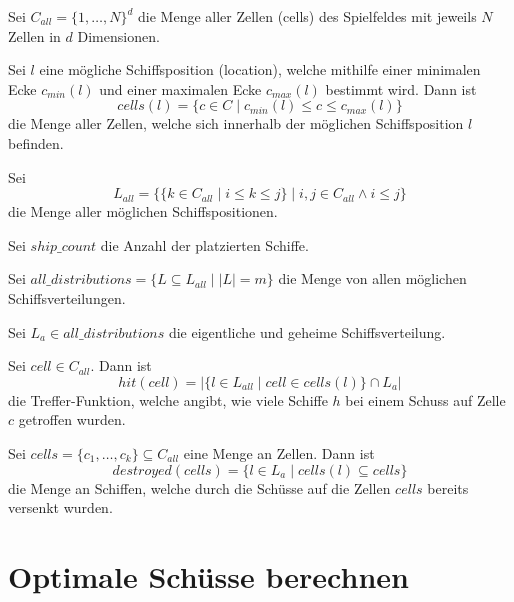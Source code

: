 \documentclass[a4paper,12pt]{llncs}
\numberwithin{equation}{section}
\begin{document}
\begin{definition}
Sei $C_{all}=\{1, \dots, N\}^d$ die Menge aller Zellen (cells) des Spielfeldes mit jeweils $N$ Zellen in $d$ Dimensionen.
\end{definition}

\begin{definition}
Sei $l$ eine mögliche Schiffsposition (location), welche mithilfe einer minimalen Ecke $c_{min}(l)$ und einer maximalen Ecke $c_{max}(l)$ bestimmt wird. Dann ist
\[
cells(l)=
\{
c
\in
C
\mid
c_{min}(l) \leq c \leq c_{max}(l)
\}
\]
die Menge aller Zellen, welche sich innerhalb der möglichen Schiffsposition $l$ befinden.
\end{definition}

\begin{definition}
Sei 
\[
L_{all}=
\{
\{
k
\in
C_{all}
\mid
i \leq k \leq j
\}
\mid
i,j \in C_{all}
\wedge
i \leq j
\}
\] die Menge aller möglichen Schiffspositionen.
\end{definition}

\begin{definition}
Sei $ship\_count$ die Anzahl der platzierten Schiffe.
\end{definition}

\begin{definition}
Sei $all\_distributions=\{L \subseteq L_{all} \mid |L|=m\}$ die Menge von allen möglichen Schiffsverteilungen.
\end{definition}

\begin{definition}
Sei $L_a \in all\_distributions$ die eigentliche und geheime Schiffsverteilung.
\end{definition}

\begin{definition}
Sei $cell \in C_{all}$.
Dann ist 
\[
hit(cell)=|\{l \in L_{all} \mid cell \in cells(l)\} \cap L_a|
\]
die Treffer-Funktion, welche angibt, wie viele Schiffe $h$ bei einem Schuss auf Zelle $c$ getroffen wurden.
\end{definition}

\begin{definition}
Sei $cells=\{c_1, \dots, c_k\} \subseteq C_{all}$ eine Menge an Zellen.
Dann ist
\[
destroyed(cells)=\{l \in L_a \mid cells(l) \subseteq cells\}
\]
die Menge an Schiffen, welche durch die Schüsse auf die Zellen $cells$ bereits versenkt wurden.
\end{definition}

\section{Optimale Schüsse berechnen}
\end{document}
